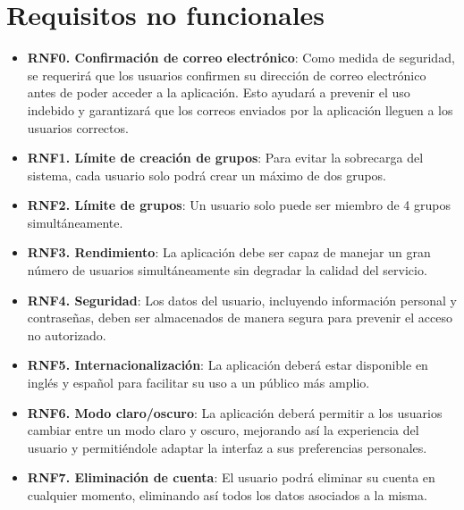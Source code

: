     \section{Requisitos no funcionales}
        \begin{itemize}
        \item \textbf{RNF0. Confirmación de correo electrónico}: Como medida de seguridad, se requerirá que los usuarios confirmen su dirección de correo electrónico antes de poder acceder a la aplicación. Esto ayudará a prevenir el uso indebido y garantizará que los correos enviados por la aplicación lleguen a los usuarios correctos.
        \item \textbf{RNF1. Límite de creación de grupos}: Para evitar la sobrecarga del sistema, cada usuario solo podrá crear un máximo de dos grupos.
        \item \textbf{RNF2. Límite de grupos}: Un usuario solo puede ser miembro de 4 grupos simultáneamente.
        \item \textbf{RNF3. Rendimiento}: La aplicación debe ser capaz de manejar un gran número de usuarios simultáneamente sin degradar la calidad del servicio.
        \item \textbf{RNF4. Seguridad}: Los datos del usuario, incluyendo información personal y contraseñas, deben ser almacenados de manera segura para prevenir el acceso no autorizado.
        \item \textbf{RNF5. Internacionalización}: La aplicación deberá estar disponible en inglés y español para facilitar su uso a un público más amplio.
        \item \textbf{RNF6. Modo claro/oscuro}: La aplicación deberá permitir a los usuarios cambiar entre un modo claro y oscuro, mejorando así la experiencia del usuario y permitiéndole adaptar la interfaz a sus preferencias personales.
        \item \textbf{RNF7. Eliminación de cuenta}: El usuario podrá eliminar su cuenta en cualquier momento, eliminando así todos los datos asociados a la misma.

    \end{itemize}